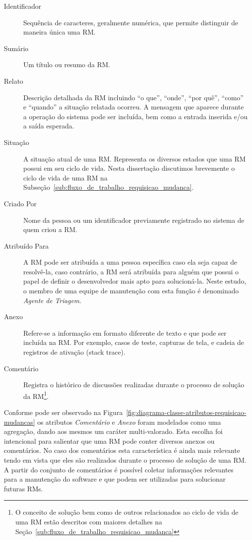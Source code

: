 \begin{description}
    \item [Identificador] Sequência de caracteres, geralmente numérica,  que
        permite distinguir de maneira única uma RM\@.
	\item [Sumário] Um título ou resumo da RM\@.
    \item [Relato] Descrição detalhada da RM incluindo ``o que'', ``onde'',
        ``por quê'', ``como'' e ``quando'' a situação relatada ocorreu. A
        mensagem que aparece durante a operação do sistema pode ser incluída,
        bem como a entrada inserida e/ou a saída esperada.
	\item [Situação] A situação atual de uma RM\@. Representa os diversos
		estados que uma RM possui em seu ciclo de vida. Nesta dissertação
		discutimos brevemente o ciclo de vida de uma RM na
		Subseção~\ref{sub:fluxo_de_trabalho_requisicao_mudanca}.
    \item [Criado Por] Nome da pessoa ou um identificador previamente registrado
        no sistema de quem criou a RM\@.
    \item [Atribuído Para] A RM pode ser atribuída a uma pessoa específica caso
        ela seja capaz de resolvê-la, caso contrário, a RM será atribuída para
        alguém que possui o papel de definir o desenvolvedor mais apto para
        solucioná-la. Neste estudo, o membro de uma equipe de manutenção com
        esta função é denominado \textit{Agente de Triagem}.
    \item [Anexo] Refere-se a informação em formato diferente de texto e que
        pode ser incluída na RM\@. Por exemplo, casos de teste, capturas de
        tela, e cadeia de registros de ativação (stack trace).
    \item [Comentário] Registra o histórico de discussões realizadas durante o
        processo de solução da RM\@\footnote{O conceito de solução bem como de
            outros relacionados ao ciclo de vida de uma RM estão descritos com
        maiores detalhes na Seção~\ref{sub:fluxo_de_trabalho_requisicao_mudanca}}.
\end{description}

Conforme pode ser observado na
Figura~\ref{fig:diagrama-classe-atributos-requisicao-mudancas} os atributos
\textit{Comentário} e \textit{Anexo} foram modelados como uma agregação, dando
aos mesmos um caráter multi-valorado. Esta escolha foi intencional para salientar
que uma RM pode conter diversos anexos ou comentários. No caso dos comentários
esta característica é ainda mais relevante tendo em vista que eles são
realizados durante o processo de solução de uma RM\@. A partir do conjunto de
comentários é possível coletar informações relevantes para a manutenção do
software e que podem ser utilizadas para solucionar futuras RMs.


